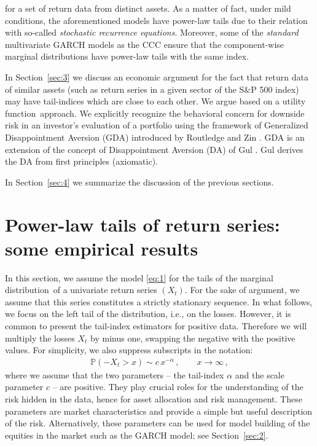 \documentclass[11pt,a4]{amsart}
\newcommand{\sre}{stochastic recurrence equation}
\newcommand{\beam}{\begin{eqnarray}}
\newcommand{\eeam}{\end{eqnarray}\noindent}
\newcommand{\xto}{x\to\infty}
\newcommand{\fct}{function}
\newcommand{\ds}{distribution}
\newcommand{\seq}{sequence}
\renewcommand{\P }{{\mathbb P}}
\newcommand{\1}{{\mathbf 1}}
\begin{document}
for a set of return data from distinct assets. As a matter of fact, under mild conditions, the aforementioned models
have power-law tails due to their relation with so-called {\em \sre s}. Moreover, some of the {\em standard} multivariate 
GARCH models as the CCC ensure that the component-wise marginal \ds s have power-law tails with the same index.
\par
In Section~\ref{sec:3} we discuss an economic argument for the fact that return data of similar assets
(such as return series in a given sector of the S\&P 500 index) may have tail-indices which are close to each other.
We argue based on a  utility \fct\ approach. We explicitly recognize the behavioral
concern for downside risk in an investor's evaluation of a portfolio
using the framework of Generalized Disappointment Aversion (GDA)
introduced by Routledge and Zin \cite{routledge2010generalized}. GDA
is an extension of the concept of Disappointment Aversion (DA) of Gul \cite{gul:1991}. Gul derives the DA from first principles (axiomatic).

In Section~\ref{sec:4} we summarize the discussion of the previous
sections. 

\section{Power-law tails of return series: some empirical results}\label{sec:1}\setcounter{equation}{0}
In this section, we assume the model \eqref{eq:1} for the tails of the marginal
\ds\ of a univariate return series $(X_t)$. For the sake of argument, we assume
that this series constitutes a strictly stationary \seq . In what follows, we focus
on the left tail of the \ds , i.e., on the losses. 
However, it is common to present the tail-index estimators
for positive data. Therefore we will multiply the losses $X_t$ by
minus one, swapping the negative with the positive values.
For simplicity, we also suppress subscripts in the notation:
\beam\label{eq:1a}
\P(-X_t>x)\sim c\,x^{-\alpha}\,,\qquad \xto\,,
\eeam
where we assume that the two parameters -- the tail-index  $\alpha$ and the scale parameter
$c$ -- are positive. They play crucial roles for the understanding of the risk hidden in the data, hence 
for asset allocation and risk management. These parameters are market characteristics  and provide a simple but 
useful description of the risk. Alternatively, these parameters can be
used for model building of the equities in the market such as the GARCH model; see Section~\ref{sec:2}.
\end{document}
